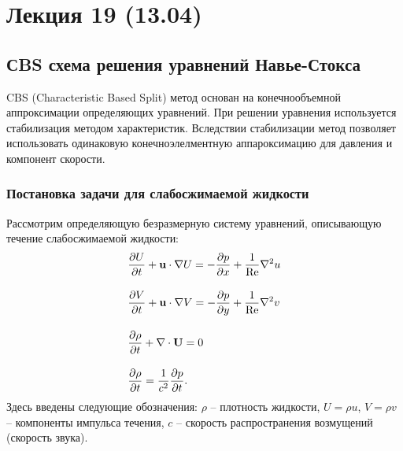 \section{Лекция 19 (13.04)}

\subsection{СBS схема решения уравнений Навье-Стокса}
CBS (Characteristic Based Split)
метод основан на конечнообъемной аппроксимации определяющих уравнений.
При решении уравнения используется стабилизация методом характеристик.
Вследствии стабилизации метод позволяет использовать одинаковую конечноэлелментную
аппароксимацию для давления и компонент скорости.

\subsubsection{Постановка задачи для слабосжимаемой жидкости}
Рассмотрим определяющую безразмерную систему уравнений, описывающую
течение слабосжимаемой жидкости:
\begin{align}
\label{eq:cbs_u}
&\frac{\partial U}{\partial t} + \boldsymbol{\rm u}\cdot\nabla U = -\frac{\partial p}{\partial x} + \frac{1}{\mathrm{Re}}\nabla^2 u \\[10pt]
\label{eq:cbs_v}
&\frac{\partial V}{\partial t} + \boldsymbol{\rm u}\cdot\nabla V = -\frac{\partial p}{\partial y} + \frac{1}{\mathrm{Re}}\nabla^2 v \\[10pt]
\label{eq:cbs_rho}
&\frac{\partial \rho}{\partial t} + \nabla\cdot\boldsymbol{\rm U} = 0 \\[10pt]
\label{eq:cbs_rho_p}
&\frac{\partial \rho}{\partial t} = \frac{1}{c^2}\frac{\partial p}{\partial t}.
\end{align}
Здесь введены следующие обозначения:
$\rho$ -- плотность жидкости,
$U = \rho u$, $V = \rho v$ -- компоненты импульса течения,
$c$ -- скорость распространения возмущений (скорость звука).

